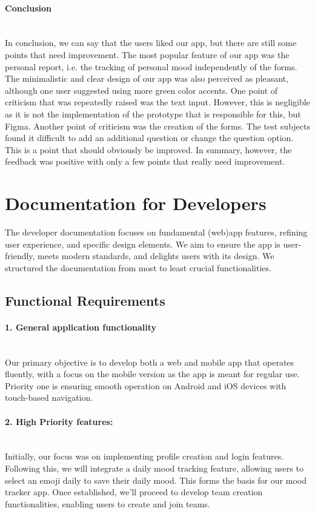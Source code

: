 \documentclass[11pt]{article}
\begin{document}
\paragraph{Conclusion}\mbox{}\\
In conclusion, we can say that the users liked our app, but there are still some points that need improvement. The most popular feature of our app was the personal report, i.e. the tracking of personal mood independently of the forms. The minimalistic and clear design of our app was also perceived as pleasant, although one user suggested using more green color accents. One point of criticism that was repeatedly raised was the text input. However, this is negligible as it is not the implementation of the prototype that is responsible for this, but Figma. Another point of criticism was the creation of the forms. The test subjects found it difficult to add an additional question or change the question option. This is a point that should obviously be improved. 
In summary, however, the feedback was positive with only a few points that really need improvement.



\clearpage
\section{Documentation for Developers}
The developer documentation focuses on fundamental (web)app features, refining user experience, and specific design elements.
We aim to ensure the app is user-friendly, meets modern standards, and delights users with its design. We structured the documentation from most to least crucial functionalities.

\subsection{Functional Requirements}
    \paragraph{1. General application functionality} \mbox{} \\
    Our primary objective is to develop both a web and mobile app that operates fluently, with a focus on the mobile version as the app is meant for regular use. Priority one is ensuring smooth operation on Android and iOS devices with touch-based navigation.

    \paragraph{2. High Priority features:} \mbox{} \\
    Initially, our focus was on implementing profile creation and login features. Following this, we will integrate a daily mood tracking feature, allowing users to select an emoji daily to save their daily mood. This forms the basis for our mood tracker app. Once established, we'll proceed to develop team creation functionalities, enabling users to create and join teams.
    
\end{document}
